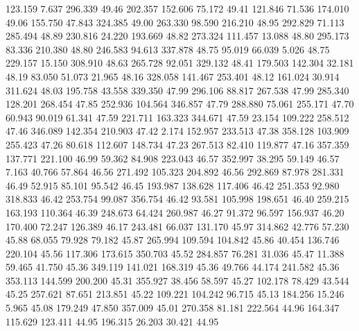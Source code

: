  123.159    7.637  296.339        49.46
 202.357  152.606   75.172        49.41
 121.846   71.536  174.010        49.06
 155.750   47.843  324.385        49.00
 263.330   98.590  216.210        48.95
 292.829   71.113  285.494        48.89
 230.816   24.220  193.669        48.82
 273.324  111.457   13.088        48.80
 295.173   83.336  210.380        48.80
 246.583   94.613  337.878        48.75
  95.019   66.039    5.026        48.75
 229.157   15.150  308.910        48.63
 265.728   92.051  329.132        48.41
 179.503  142.304   32.181        48.19
  83.050   51.073   21.965        48.16
 328.058  141.467  253.401        48.12
 161.024   30.914  311.624        48.03
 195.758   43.558  339.350        47.99
 296.106   88.817  267.538        47.99
 285.340  128.201  268.454        47.85
 252.936  104.564  346.857        47.79
 288.880   75.061  255.171        47.70
  60.943   90.019   61.341        47.59
 221.711  163.323  344.671        47.59
  23.154  109.222  258.512        47.46
 346.089  142.354  210.903        47.42
   2.174  152.957  233.513        47.38
 358.128  103.909  255.423        47.26
  80.618  112.607  148.734        47.23
 267.513   82.410  119.877        47.16
 357.359  137.771  221.100        46.99
  59.362   84.908  223.043        46.57
 352.997   38.295   59.149        46.57
   7.163   40.766   57.864        46.56
 271.492  105.323  204.892        46.56
 292.869   87.978  281.331        46.49
  52.915   85.101   95.542        46.45
 193.987  138.628  117.406        46.42
 251.353   92.980  318.833        46.42
 253.754   99.087  356.754        46.42
  93.581  105.998  198.651        46.40
 259.215  163.193  110.364        46.39
 248.673   64.424  260.987        46.27
  91.372   96.597  156.937        46.20
 170.400   72.247  126.389        46.17
 243.481   66.037  131.170        45.97
 314.862   42.776   57.230        45.88
  68.055   79.928   79.182        45.87
 265.994  109.594  104.842        45.86
  40.454  136.746  220.104        45.56
 117.306  173.615  350.703        45.52
 284.857   76.281   31.036        45.47
  11.388   59.465   41.750        45.36
 349.119  141.021  168.319        45.36
  49.766   44.174  241.582        45.36
 353.113  144.599  200.200        45.31
 355.927   38.456   58.597        45.27
 102.178   78.429   43.544        45.25
 257.621   87.651  213.851        45.22
 109.221  104.242   96.715        45.13
 184.256   15.246    5.965        45.08
 179.249   47.850  357.009        45.01
 270.358   81.181  222.564        44.96
 164.347  115.629  123.411        44.95
 196.315   26.203   30.421        44.95
